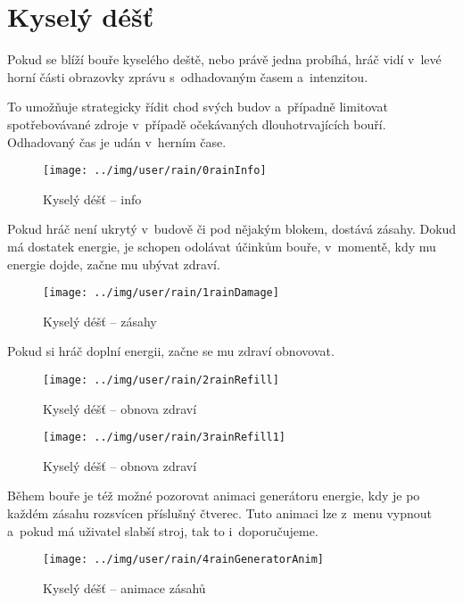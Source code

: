 
\section{Kyselý déšť}

Pokud se blíží bouře kyselého deště, nebo právě jedna probíhá, hráč vidí v~levé horní části obrazovky zprávu s~odhadovaným časem a~intenzitou.

To umožňuje strategicky řídit chod svých budov a~případně limitovat spotřebovávané zdroje v~případě očekávaných dlouhotrvajících bouří. Odhadovaný čas je udán v~herním čase.

\begin{figure}[!ht]\centering
\texttt{[image: ../img/user/rain/0rainInfo]}

\caption{Kyselý déšť -- info}
\label{fig:user_rain_0rainInfo}

\end{figure}

\FloatBarrier

Pokud hráč není ukrytý v~budově či pod nějakým blokem, dostává zásahy. Dokud má dostatek energie, je schopen odolávat účinkům bouře, v~momentě, kdy mu energie dojde, začne mu ubývat zdraví.


\begin{figure}[!ht]\centering
\texttt{[image: ../img/user/rain/1rainDamage]}

\caption{Kyselý déšť -- zásahy}
\label{fig:user_rain_1rainDamage}

\end{figure}

\FloatBarrier

Pokud si hráč doplní energii, začne se mu zdraví obnovovat.

\begin{figure}[!ht]\centering
\texttt{[image: ../img/user/rain/2rainRefill]}

\caption{Kyselý déšť -- obnova zdraví}
\label{fig:user_rain_2rainRefill}

\end{figure}


\begin{figure}[!ht]\centering
\texttt{[image: ../img/user/rain/3rainRefill1]}

\caption{Kyselý déšť -- obnova zdraví}
\label{fig:user_rain_3rainRefill1}

\end{figure}

\FloatBarrier

Během bouře je též možné pozorovat animaci generátoru energie, kdy je po každém zásahu rozsvícen příslušný čtverec. Tuto animaci lze z~menu vypnout a~pokud má uživatel slabší stroj, tak to i~doporučujeme.

\begin{figure}[!ht]\centering
\texttt{[image: ../img/user/rain/4rainGeneratorAnim]}

\caption{Kyselý déšť -- animace zásahů}
\label{fig:user_rain_4rainGeneratorAnim}

\end{figure}


\FloatBarrier
